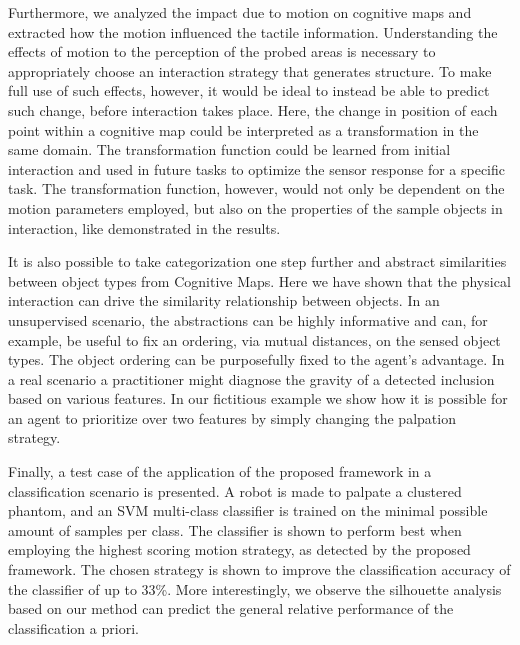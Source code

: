 Furthermore, we analyzed the impact due to motion on cognitive maps and extracted how the motion influenced 
the tactile information. Understanding the effects of motion to the perception of the probed areas 
is necessary to appropriately choose an interaction strategy that generates structure.
To make full use of such effects, however, it would be ideal to instead be able 
to predict such change, before interaction takes place. Here, the change in position 
of each point within a cognitive map could be interpreted as a transformation in the same domain. 
The transformation function could be learned from initial interaction and used in future tasks to 
optimize the sensor response for a specific task. The transformation function, however, would not only be 
dependent on the motion parameters employed, but also on the properties of the sample objects in interaction, 
like demonstrated in the results. 

It is also possible to take categorization one step further and abstract 
similarities between object types from Cognitive Maps. Here we have shown that the physical interaction 
can drive the similarity relationship between objects.
In an unsupervised scenario, the abstractions can be highly informative and can, 
for example, be useful to fix an ordering, via mutual distances, on the sensed object types. 
The object ordering can be purposefully fixed to the agent's advantage. In a real scenario
a practitioner might diagnose the gravity of a detected inclusion based on various features. 
In our fictitious example we show how it is possible for an agent to prioritize over two features by 
simply changing the palpation strategy. 


Finally, a test case of the application of the proposed framework in a classification scenario is presented.
A robot is made to palpate a clustered phantom, and an SVM multi-class classifier is trained on the minimal possible amount of samples per class.
The classifier is shown to perform best when employing the highest scoring motion strategy, as detected by the proposed framework. The chosen strategy is shown to improve the classification accuracy of the classifier of up to 33\%. More interestingly, we observe the silhouette analysis based on our method can predict the general relative performance of the classification a priori. 



